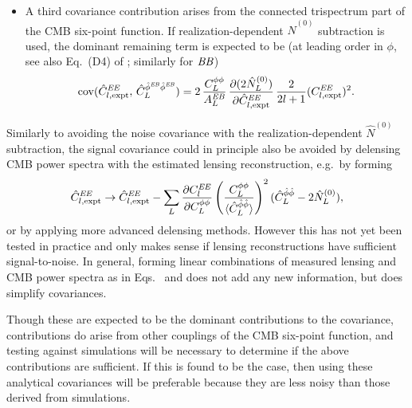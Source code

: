 \begin{itemize}
\item A third covariance contribution  arises from the connected trispectrum part of the CMB six-point function. If realization-dependent $\hat N^{(0)}$  subtraction is used, the dominant remaining term is expected to be (at leading order in $\phi$, see also Eq.~(D4) of \cite{Schmittfull:2013uea}; similarly for $\mathit{BB}$)
\begin{equation}
  \label{eq:cov_EBEB_EE}
      \mathrm{cov}(\hat C_{l,\mathrm{expt}}^{\mathit{EE}},\, \hat C_L^{\hat\phi^{\mathit{EB}}\hat\phi^{\mathit{EB}}}) = 
2\,\frac{C^{\phi\phi}_L}{A_L^{\mathit{EB}}}\,
\frac{\partial (2\hat N_L^{(0)})}{\partial \hat C^{\mathit{EE}}_{l,\mathrm{expt}}}\,
\frac{2}{2l+1}
(C^{\mathit{EE}}_{l,\mathrm{expt}})^2.
\end{equation}

\end{itemize}

Similarly to avoiding the noise covariance with the realization-dependent $\hat N^{(0)}$ subtraction, the signal covariance could in principle also be avoided by delensing CMB power spectra with the estimated lensing reconstruction, e.g.~by forming \cite{Schmittfull:2013uea}
\begin{equation}
  \label{eq:matter_CV_mitigation}
  \hat{C}^{\mathit{EE}}_{l,\mathrm{expt}} \to  \hat{C}^{\mathit{EE}}_{l,\mathrm{expt}}- 
\sum_{L} 
 \frac{\partial C_{l}^{\mathit{EE}}}{\partial C_{L}^{\phi\phi}}
\left(\frac{C_{L}^{\phi\phi}}{\langle
\hat{C}_{L}^{\hat{\phi}\hat{\phi}}\rangle}\right)^2
(\hat{C}_{L}^{\hat{\phi}\hat{\phi}}-2\hat{N}_{L}^{(0)}),
\end{equation}
or by applying more advanced delensing methods.  However this has not yet been tested in practice and only makes sense if lensing reconstructions have sufficient signal-to-noise.  In general, forming linear combinations of measured lensing and CMB power spectra as in Eqs.~ and  does not add any new information, but does simplify covariances.

Though these are expected to be the dominant contributions to the covariance, 
contributions do arise from other couplings of the CMB six-point function, and testing against simulations will be necessary to determine if the above contributions are sufficient.  If this is found to be the case, then using these analytical covariances will be preferable because they are less noisy than those derived from simulations.   
 
